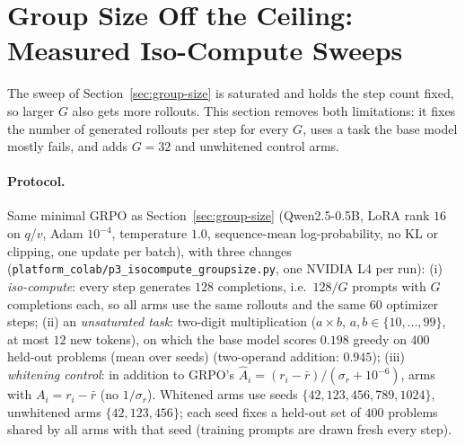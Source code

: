 \section{Group Size Off the Ceiling: Measured Iso-Compute Sweeps}
\label{sec:group-size-scaleup}

The sweep of Section~\ref{sec:group-size} is saturated and holds the step count
fixed, so larger $G$ also gets more rollouts. This section removes both
limitations: it fixes the number of generated rollouts per step for every $G$,
uses a task the base model mostly fails, and adds $G{=}32$ and unwhitened control
arms.

\paragraph{Protocol.}
Same minimal GRPO as Section~\ref{sec:group-size} (Qwen2.5-0.5B, LoRA rank $16$ on
$q$/$v$, Adam $10^{-4}$, temperature $1.0$, sequence-mean log-probability, no KL or
clipping, one update per batch), with three changes
(\texttt{platform\_colab/p3\_isocompute\_groupsize.py}, one NVIDIA L4 per run):
(i) \emph{iso-compute}: every step generates $128$ completions, i.e.\ $128/G$
prompts with $G$ completions each, so all arms use the same rollouts and the same
$60$ optimizer steps; (ii) an \emph{unsaturated task}: two-digit multiplication
($a\times b$, $a,b\in\{10,\dots,99\}$, at most $12$ new tokens), on which the base
model scores $0.198$ greedy on $400$ held-out problems (mean over seeds) (two-operand addition: $0.945$);
(iii) \emph{whitening control}: in addition to GRPO's
$\hat A_i=(r_i-\bar r)/(\sigma_r+10^{-6})$, arms with $A_i=r_i-\bar r$ (no $1/\sigma_r$).
Whitened arms use seeds $\{42,123,456,789,1024\}$, unwhitened arms
$\{42,123,456\}$; each seed fixes a held-out set of $400$ problems shared by all arms
with that seed (training prompts are drawn fresh every step).

